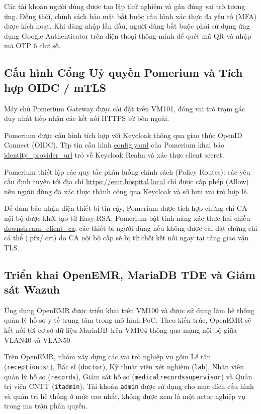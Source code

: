 Các tài khoản người dùng được tạo lập thử nghiệm và gán đúng vai trò tương ứng. Đồng thời, chính sách bảo mật bắt buộc cấu hình xác thực đa yếu tố (MFA) được kích hoạt. Khi đăng nhập lần đầu, người dùng bắt buộc phải sử dụng ứng dụng Google Authenticator trên điện thoại thông minh để quét mã QR và nhập mã OTP 6 chữ số.

\subsection{Cấu hình Cổng Uỷ quyền Pomerium và Tích hợp OIDC / mTLS}

Máy chủ Pomerium Gateway được cài đặt trên VM101, đóng vai trò trạm gác duy nhất tiếp nhận các kết nối HTTPS từ bên ngoài.

Pomerium được cấu hình tích hợp với Keycloak thông qua giao thức OpenID Connect (OIDC). Tệp tin cấu hình \url{config.yaml} của Pomerium khai báo \url{identity_provider_url} trỏ về Keycloak Realm và xác thực client secret.

Pomerium thiết lập các quy tắc phân luồng chính sách (Policy Routes): các yêu cầu định tuyến tới địa chỉ \url{https://emr.hospital.local} chỉ được cấp phép (Allow) nếu người dùng đã xác thực thành công qua Keycloak và sở hữu vai trò hợp lệ.

Để đảm bảo nhận diện thiết bị tin cậy, Pomerium được tích hợp chứng chỉ CA nội bộ được khởi tạo từ Easy-RSA. Pomerium bật tính năng xác thực hai chiều \url{downstream_client_ca}; các thiết bị người dùng nếu không được cài đặt chứng chỉ cá thể (.pfx/.crt) do CA nội bộ cấp sẽ bị từ chối kết nối ngay tại tầng giao vận TLS.

\subsection{Triển khai OpenEMR, MariaDB TDE và Giám sát Wazuh}

Ứng dụng OpenEMR được triển khai trên VM100 và được sử dụng làm hệ thống quản lý hồ sơ y tế trung tâm trong mô hình PoC. Theo kiến trúc, OpenEMR sẽ kết nối tới cơ sở dữ liệu MariaDB trên VM104 thông qua mạng nội bộ giữa VLAN40 và VLAN50 

Trên OpenEMR, nhóm xây dựng các vai trò nghiệp vụ gồm Lễ tân (\texttt{receptionist}), Bác sĩ (\texttt{doctor}), Kỹ thuật viên xét nghiệm (\texttt{lab}), Nhân viên quản lý hồ sơ (\texttt{records}), Giám sát hồ sơ (\texttt{medicalrecordssupervisor}) và Quản trị viên CNTT (\texttt{itadmin}). Tài khoản \texttt{admin} được sử dụng cho mục đích cấu hình và quản trị hệ thống ở mức cao nhất, không được xem là một actor nghiệp vụ trong ma trận phân quyền.

